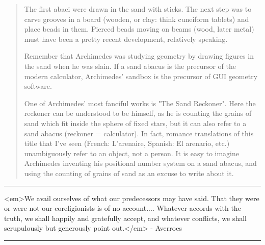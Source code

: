 \begin{quote}
The first abaci were drawn in the sand with sticks. The next
step was to carve grooves in a board (wooden, or clay: think
cuneiform tablets) and place beads in them. Pierced beads
moving on beams (wood, later metal) must have been a pretty
recent development, relatively speaking.

Remember that Archimedes was studying geometry by drawing
figures in the sand when he was slain. If a sand abacus is the
precursor of the modern calculator, Archimedes' sandbox is the
precursor of GUI geometry software. 

One of Archimedes' most fanciful works is "The Sand Reckoner".
Here the reckoner can be understood to be himself, as he is
counting the grains of sand which fit inside the sphere of
fixed stars, but it can also refer to a sand abacus (reckoner
= calculator). In fact, romance translations of this title
that I've seen (French: L'arenaire, Spanish: El arenario, etc.)
unambiguously refer to an object, not a person. It is easy to
imagine Archimedes inventing his positional number system on a
sand abacus, and using the counting of grains of sand as an
excuse to write about it.

\end{quote}


\par\noindent\rule{\textwidth}{0.4pt}
<em>We avail ourselves of what our predecessors may have said.  
That they were or were not our coreligionists is of no account....
Whatever accords with the truth, we shall happily and gratefully
accept, and whatever conflicts, we shall scrupulously but generously
point out.</em> - Averroes 

\par\noindent\rule{\textwidth}{0.4pt}

